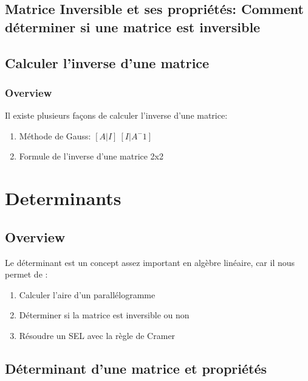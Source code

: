 \documentclass{article}
\begin{document}
\subsection{Matrice Inversible et ses propriétés: Comment déterminer si une
matrice est inversible}%
\label{sub:Matrice Inversible et ses propriétés}

\subsection{Calculer l'inverse d'une matrice}%
\label{sub:Calculer l'inverse d'une matrice}

\subsubsection{Overview}%
\label{ssub:Overview}

Il existe plusieurs façons de calculer l'inverse d'une matrice:
\begin{enumerate}
    \item Méthode de Gauss: $ [A|I] ~ [I| A^-1] $
    \item Formule de l'inverse d'une matrice 2x2
\end{enumerate}

\section{Determinants}

\subsection{Overview}%
\label{sub:Overview}

Le déterminant est un concept assez important en algèbre linéaire, car il
nous permet de :
\begin{enumerate}
    \item Calculer l'aire d'un parallélogramme
    \item Déterminer si la matrice est inversible ou non
    \item Résoudre un SEL avec la règle de Cramer
\end{enumerate}

\subsection{Déterminant d'une matrice et propriétés}%
\label{sub:Déterminant d'une matrice et propriétés}

\begin{definition}
\end{definition}
\end{document}
